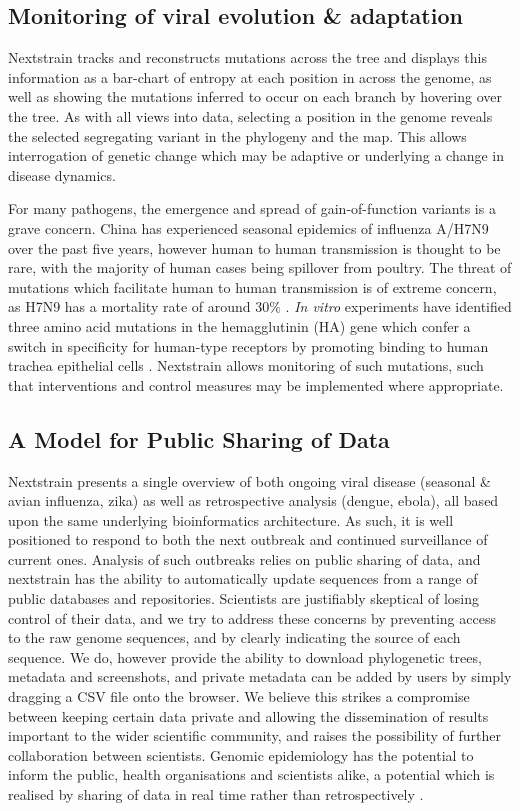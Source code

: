 \documentclass{bioinfo}
\begin{document}
\subsection*{Monitoring of viral evolution \& adaptation}
Nextstrain tracks and reconstructs mutations across the tree and displays this information as a bar-chart of entropy at each position in across the genome, as well as showing the mutations inferred to occur on each branch by hovering over the tree.
As with all views into data, selecting a position in the genome reveals the selected segregating variant in the phylogeny and the map. 
This allows interrogation of genetic change which may be adaptive or underlying a change in disease dynamics. 

For many pathogens, the emergence and spread of gain-of-function variants is a grave concern.
China has experienced seasonal epidemics of influenza A/H7N9 over the past five years, however human to human transmission is thought to be rare, with the majority of human cases being spillover from poultry. 
The threat of mutations which facilitate human to human transmission is of extreme concern, as H7N9 has a mortality rate of around $30\%$ \citep{doi:10.1056/NEJMoa1304617}.
\textit{In vitro} experiments have identified three amino acid mutations in the hemagglutinin (HA) gene which confer a switch in specificity for human-type receptors by promoting binding to human trachea epithelial cells \citep{deVries:2017dj}. 
Nextstrain allows monitoring of such mutations, such that interventions and control measures may be implemented where appropriate. 


\subsection*{A Model for Public Sharing of Data}
Nextstrain presents a single overview of both ongoing viral disease (seasonal \& avian influenza, zika) as well as retrospective analysis (dengue, ebola), all based upon the same underlying bioinformatics architecture.
As such, it is well positioned to respond to both the next outbreak and continued surveillance of current ones. 
Analysis of such outbreaks relies on public sharing of data, and nextstrain has the ability to automatically update sequences from a range of public databases and repositories.
Scientists are justifiably skeptical of losing control of their data, and we try to address these concerns by preventing access to the raw genome sequences, and by clearly indicating the source of each sequence. 
We do, however provide the ability to download phylogenetic trees, metadata and screenshots, and private metadata can be added by users by simply dragging a CSV file onto the browser. 
We believe this strikes a compromise between keeping certain data private and allowing the dissemination of results important to the wider scientific community, and raises the possibility of further collaboration between scientists.
Genomic epidemiology has the potential to inform the public, health organisations and scientists alike, a potential which is realised by sharing of data in real time rather than retrospectively \citep{Croucher:2015go}.
 
\end{document}
